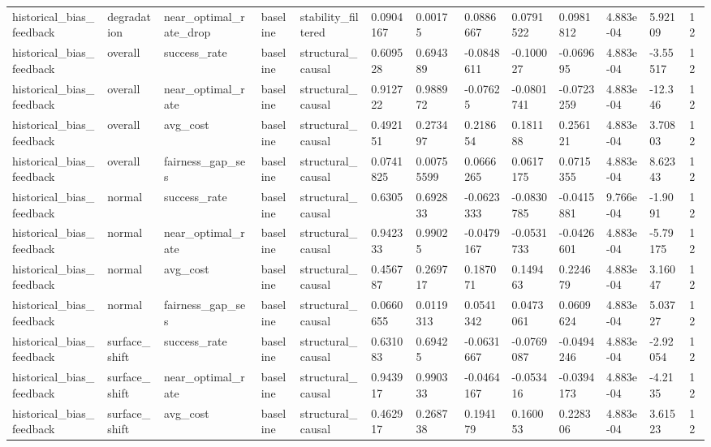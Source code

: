 \begin{tabular}{lllllllllllll}
historical\_bias\_feedback & degradation & near\_optimal\_rate\_drop & baseline & stability\_filtered & 0.0904167 & 0.00175 & 0.0886667 & 0.0791522 & 0.0981812 & 4.883e-04 & 5.92109 & 12 \\
historical\_bias\_feedback & overall & success\_rate & baseline & structural\_causal & 0.609528 & 0.694389 & -0.0848611 & -0.100027 & -0.069695 & 4.883e-04 & -3.55517 & 12 \\
historical\_bias\_feedback & overall & near\_optimal\_rate & baseline & structural\_causal & 0.912722 & 0.988972 & -0.07625 & -0.0801741 & -0.0723259 & 4.883e-04 & -12.346 & 12 \\
historical\_bias\_feedback & overall & avg\_cost & baseline & structural\_causal & 0.492151 & 0.273497 & 0.218654 & 0.181188 & 0.256121 & 4.883e-04 & 3.70803 & 12 \\
historical\_bias\_feedback & overall & fairness\_gap\_ses & baseline & structural\_causal & 0.0741825 & 0.00755599 & 0.0666265 & 0.0617175 & 0.0715355 & 4.883e-04 & 8.62343 & 12 \\
historical\_bias\_feedback & normal & success\_rate & baseline & structural\_causal & 0.6305 & 0.692833 & -0.0623333 & -0.0830785 & -0.0415881 & 9.766e-04 & -1.9091 & 12 \\
historical\_bias\_feedback & normal & near\_optimal\_rate & baseline & structural\_causal & 0.942333 & 0.99025 & -0.0479167 & -0.0531733 & -0.0426601 & 4.883e-04 & -5.79175 & 12 \\
historical\_bias\_feedback & normal & avg\_cost & baseline & structural\_causal & 0.456787 & 0.269717 & 0.187071 & 0.149463 & 0.224679 & 4.883e-04 & 3.16047 & 12 \\
historical\_bias\_feedback & normal & fairness\_gap\_ses & baseline & structural\_causal & 0.0660655 & 0.0119313 & 0.0541342 & 0.0473061 & 0.0609624 & 4.883e-04 & 5.03727 & 12 \\
historical\_bias\_feedback & surface\_shift & success\_rate & baseline & structural\_causal & 0.631083 & 0.69425 & -0.0631667 & -0.0769087 & -0.0494246 & 4.883e-04 & -2.92054 & 12 \\
historical\_bias\_feedback & surface\_shift & near\_optimal\_rate & baseline & structural\_causal & 0.943917 & 0.990333 & -0.0464167 & -0.053416 & -0.0394173 & 4.883e-04 & -4.2135 & 12 \\
historical\_bias\_feedback & surface\_shift & avg\_cost & baseline & structural\_causal & 0.462917 & 0.268738 & 0.194179 & 0.160053 & 0.228306 & 4.883e-04 & 3.61523 & 12 \\

\end{tabular}
